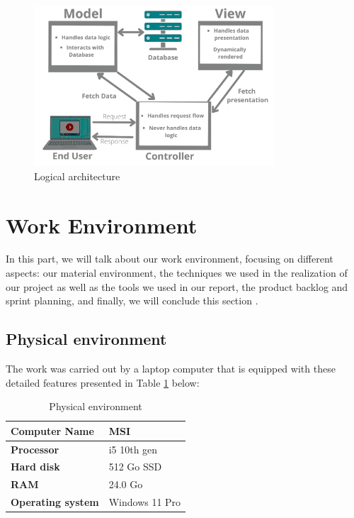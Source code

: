 \begin{figure}[htbp]
    \centering
    \includegraphics[width=0.8\textwidth]{images/logique.png}
    \caption{Logical architecture}
    \label{fig:logical-architecture}
\end{figure}

\section{Work Environment}

In this part, we will talk about our work environment, focusing on different aspects:
our material environment, the techniques we used in the realization of our project as well as the tools we used in our report, the product backlog and sprint planning, and finally, we will conclude this section \cite{BeckXP2004, MartinCleanArchitecture2017}.

\subsection{Physical environment}

The work was carried out by a laptop computer that is equipped with these detailed features presented in Table \ref{tab:physical-env} below:
\begin{table}[htbp]
    \centering
    \begin{tabular}{|l|l|}
        \hline
        \textbf{Computer Name} & MSI \\
        \hline
        \textbf{Processor} & i5 10th gen \\
        \hline
        \textbf{Hard disk} & 512 Go SSD \\
        \hline
        \textbf{RAM} & 24.0 Go \\
        \hline
        \textbf{Operating system} & Windows 11 Pro \\
        \hline
    \end{tabular}
    \caption{Physical environment}
    \label{tab:physical-env}
\end{table}

